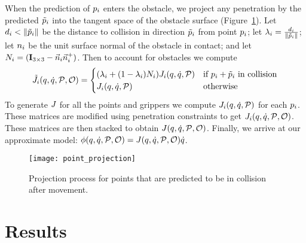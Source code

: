 When the prediction of $p_i$ enters the obstacle, we project any penetration by the predicted $\tilde{p}_i$ into the tangent space of the obstacle surface (Figure~\ref{fig:point_projection}). Let $d_i < \| \tilde{p}_i \|$ be the distance to collision in direction $\tilde{p}_i$ from point $p_i$; let $\lambda_i = \frac{d_i}{\| \tilde{p}_i \|}$; let $n_i$ be the unit surface normal of the obstacle in contact; and let $N_i = (\mathbf{I}_{3\times 3} - \vec{n}_i \vec{n}_i^+)$. Then to account for obstacles we compute
\begin{equation}
    \tilde {J}_i(q, \dot{q}, \mathcal{P}, \mathcal{O}) =
    \begin{cases}
        (\lambda_i + (1 - \lambda_i)N_i) J_i(q, \dot{q}, \mathcal{P}) & \text{if $p_i + \tilde{p}_i$ in collision} \\
        J_i(q, \dot{q}, \mathcal{P}) & \text{otherwise}
    \end{cases}
\end{equation}
To generate $J$ for all the points and grippers we compute $J_i(q, \dot{q}, \mathcal{P})$ for each $p_i$. These matrices are modified using penetration constraints to get $J_i(q, \dot{q}, \mathcal{P}, \mathcal{O})$. These matrices are then stacked to obtain $J(q, \dot{q}, \mathcal{P}, \mathcal{O})$. Finally, we arrive at our approximate model: $\phi(q, \dot{q}, \mathcal{P}, \mathcal{O}) = J(q, \dot{q}, \mathcal{P}, \mathcal{O}) \dot{q}$.

\begin{figure}[t]
    \centering
    \texttt{[image: point\_projection]}
    \caption{Projection process for points that are predicted to be in collision after movement.}
    \label{fig:point_projection}
\end{figure}


\section{Results}
\label{sec:modelling_results}

